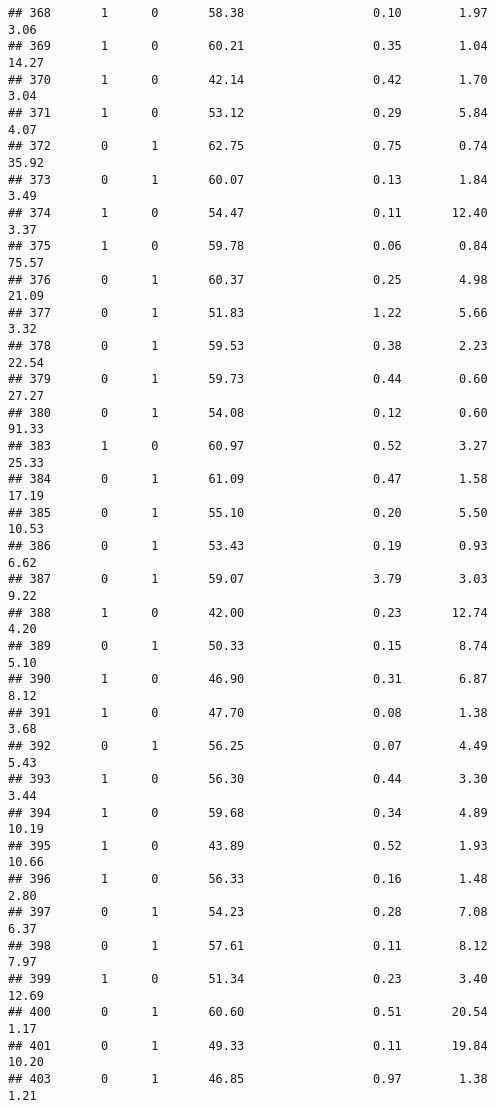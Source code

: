 \documentclass[
]{article}
\begin{document}
\begin{verbatim}
## 368       1      0       58.38                  0.10        1.97        3.06
## 369       1      0       60.21                  0.35        1.04       14.27
## 370       1      0       42.14                  0.42        1.70        3.04
## 371       1      0       53.12                  0.29        5.84        4.07
## 372       0      1       62.75                  0.75        0.74       35.92
## 373       0      1       60.07                  0.13        1.84        3.49
## 374       1      0       54.47                  0.11       12.40        3.37
## 375       1      0       59.78                  0.06        0.84       75.57
## 376       0      1       60.37                  0.25        4.98       21.09
## 377       0      1       51.83                  1.22        5.66        3.32
## 378       0      1       59.53                  0.38        2.23       22.54
## 379       0      1       59.73                  0.44        0.60       27.27
## 380       0      1       54.08                  0.12        0.60       91.33
## 383       1      0       60.97                  0.52        3.27       25.33
## 384       0      1       61.09                  0.47        1.58       17.19
## 385       0      1       55.10                  0.20        5.50       10.53
## 386       0      1       53.43                  0.19        0.93        6.62
## 387       0      1       59.07                  3.79        3.03        9.22
## 388       1      0       42.00                  0.23       12.74        4.20
## 389       0      1       50.33                  0.15        8.74        5.10
## 390       1      0       46.90                  0.31        6.87        8.12
## 391       1      0       47.70                  0.08        1.38        3.68
## 392       0      1       56.25                  0.07        4.49        5.43
## 393       1      0       56.30                  0.44        3.30        3.44
## 394       1      0       59.68                  0.34        4.89       10.19
## 395       1      0       43.89                  0.52        1.93       10.66
## 396       1      0       56.33                  0.16        1.48        2.80
## 397       0      1       54.23                  0.28        7.08        6.37
## 398       0      1       57.61                  0.11        8.12        7.97
## 399       1      0       51.34                  0.23        3.40       12.69
## 400       0      1       60.60                  0.51       20.54        1.17
## 401       0      1       49.33                  0.11       19.84       10.20
## 403       0      1       46.85                  0.97        1.38        1.21

\end{verbatim}
\end{document}
